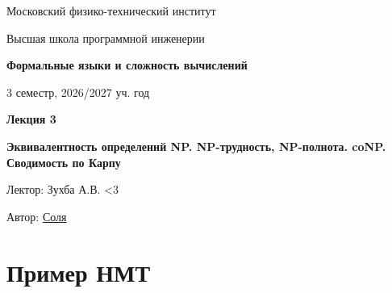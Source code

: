 \documentclass[11pt]{article}
\newcommand{\lectureNumber}{3}
\newcommand{\lectureTitle}{Эквивалентность определений NP. NP-трудность, NP-полнота. coNP. Сводимость по Карпу}
\newcommand{\courseName}{Формальные языки и сложность вычислений}
\newcommand{\semester}{3 семестр, 2026/2027 уч. год}
\begin{document}
\begin{titlepage}
    \centering
    
    {\large Московский физико-технический институт \par}
    {\large Высшая школа программной инженерии \par}
    \vspace{2cm}

    {\Large \textbf{\courseName} \par}
    {\large \semester \par}
    
    \vspace*{\fill}

    {\Huge \textbf{Лекция \lectureNumber} \par}
    {\Huge \textbf{\lectureTitle} \par}
    
    \vspace*{\fill}
    
    {\large Лектор: Зухба А.В. <3 \par}
    {\large Автор: \href{t.me/sol_m_07}{Соля} \par}

\end{titlepage}


\section{Пример НМТ}
\end{document}
